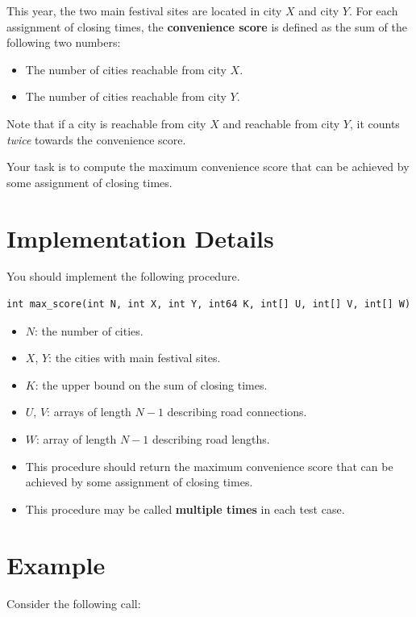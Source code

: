 This year, the two main festival sites are located in city $X$ and
city $Y$. For each assignment of closing times, the
\textbf{convenience score} is defined as the sum of the following two
numbers:
\begin{itemize}
  \item The number of cities reachable from city $X$.
  \item The number of cities reachable from city $Y$.
\end{itemize}

Note that if a city is reachable from city $X$ and reachable from city
$Y$, it counts \emph{twice} towards the convenience score.

Your task is to compute the maximum convenience score that can be
achieved by some assignment of closing times.

\section*{Implementation Details}

You should implement the following procedure.

\begin{verbatim}
int max_score(int N, int X, int Y, int64 K, int[] U, int[] V, int[] W)
\end{verbatim}

\begin{itemize}
\item
  $N$: the number of cities.
\item
  $X$, $Y$: the cities with main festival sites.
\item
  $K$: the upper bound on the sum of closing times.
\item
  $U$, $V$: arrays of length $N - 1$ describing road connections.
\item
  $W$: array of length $N - 1$ describing road lengths.
\item
  This procedure should return the maximum convenience score that can be
  achieved by some assignment of closing times.
\item
  This procedure may be called \textbf{multiple times} in each test
  case.
\end{itemize}

\section*{Example}

Consider the following call:


